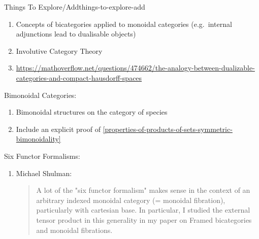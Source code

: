 \begin{remark}{Things To Explore/Add}{things-to-explore-add}
\begin{enumerate}
        \item Concepts of bicategories applied to monoidal categories (e.g.\ internal adjunctions lead to dualisable objects)
        \item Involutive Category Theory
        \item \url{https://mathoverflow.net/questions/474662/the-analogy-between-dualizable-categories-and-compact-hausdorff-spaces}
    \end{enumerate}
    Bimonoidal Categories:
    \begin{enumerate}
        \item Bimonoidal structures on the category of species
        \item Include an explicit proof of \cref{properties-of-products-of-sets-symmetric-bimonoidality}
    \end{enumerate}
    Six Functor Formalisms:
    \begin{enumerate}
        \item Michael Shulman: 
            \begin{quote}
                A lot of the "six functor formalism" makes sense in the context of an arbitrary indexed monoidal category (= monoidal fibration), particularly with cartesian base. In particular, I studied the external tensor product in this generality in my paper on Framed bicategories and monoidal fibrations.


\end{quote}
\end{enumerate}
\end{remark}
